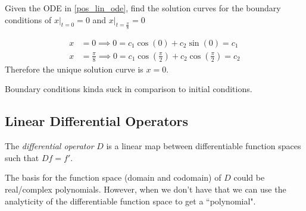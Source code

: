 \documentclass[notes.tex]{subfiles}
\begin{document}
\begin{exercise}
    Given the ODE in \cref{pos_lin_ode}, find the solution curves for the boundary conditions of $x|_{t = 0} = 0$ and $x|_{t = \frac{\pi}{8}} = 0$
\end{exercise}
\begin{solution}
    \begin{align*}
        x &= 0 \implies 0 = c_1\cos(0) + c_2\sin(0) = c_1 \\
        x &= \frac{\pi}{8} \implies 0 = c_1\cos\left(\frac{\pi}{2}\right) + c_2\cos\left(\frac{\pi}{2}\right) = c_2
    \end{align*}
    Therefore the unique solution curve is $x = 0$.
\end{solution}
Boundary conditions kinda suck in comparison to initial conditions.

\subsection{Linear Differential Operators}
\begin{definition}
    The \textit{differential operator} $D$ is a linear map between differentiable function spaces such that $Df = f'$.
\end{definition}
The basis for the function space (domain and codomain) of $D$ could be real/complex polynomials. However, when we don't have that we can use the analyticity of the differentiable function space to get a ``polynomial".
\end{document}
